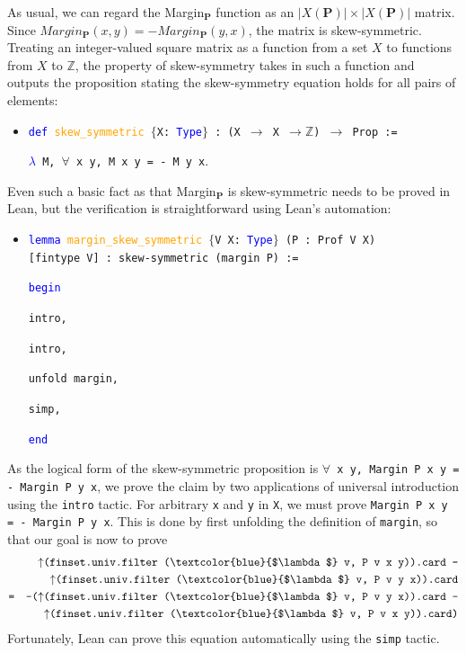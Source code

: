 \documentclass[runningheads]{llncs}
\begin{document}
As usual, we can regard the Margin$_\mathbf{P}$ function as an $|X(\mathbf{P})|\times |X(\mathbf{P})|$ matrix. Since $Margin_\mathbf{P}(x,y)=-Margin_\mathbf{P}(y,x)$, the matrix is skew-symmetric. Treating an integer-valued square matrix as a function from a set $X$ to functions from $X$ to $\mathbb{Z}$, the property of skew-symmetry takes in such a function and outputs the proposition stating the skew-symmetry equation holds for all pairs of elements:
\begin{itemize}
\item[] \texttt{\textcolor{blue}{def} \textcolor{orange}{skew\_symmetric} $\{$X: \textcolor{blue}{Type}$\}$ : (X $\to$ X $\to \mathbb{Z}$) $\to$ Prop :=} 

\texttt{\textcolor{blue}{$\lambda$} M, $\forall$ x y, M x y = - M y x}.
\end{itemize}
Even such a basic fact as that Margin$_\mathbf{P}$ is skew-symmetric needs to be proved in Lean, but the verification is straightforward using Lean's automation:
\begin{itemize}
\item[] \texttt{\textcolor{blue}{lemma} \textcolor{orange}{margin\_skew\_symmetric} $\{$V X: \textcolor{blue}{Type}$\}$ (P : Prof V X)}\\ \texttt{[fintype V] : skew-symmetric (margin P) :=} 
 
\texttt{\textcolor{blue}{begin}}

\quad \texttt{intro,}

\quad  \texttt{intro,}

\quad \texttt{unfold margin,}

\quad \texttt{simp,}

\texttt{\textcolor{blue}{end}}
\end{itemize}
As the logical form of the skew-symmetric proposition is \texttt{$\forall$ x y, Margin~P~x~y = - Margin P y x}, we prove the claim by two applications of universal introduction using the \texttt{intro} tactic. For arbitrary \texttt{x} and \texttt{y} in \texttt{X}, we must prove \texttt{Margin~P~x~y = - Margin P y x}. This is done by first unfolding the definition of \texttt{margin}, so that our goal is now to prove  
\begin{eqnarray*}
&&\mbox{\texttt{$\uparrow$(finset.univ.filter (\textcolor{blue}{$\lambda$} v, P v x y)).card -}} \\ 
  &&      \mbox{\texttt{$\uparrow$(finset.univ.filter (\textcolor{blue}{$\lambda$} v, P v y x)).card}}\\
  &\texttt{=}& \mbox{\texttt{-($\uparrow$(finset.univ.filter (\textcolor{blue}{$\lambda$} v, P v y x)).card -}} \\ 
    &&      \mbox{\texttt{$\uparrow$(finset.univ.filter (\textcolor{blue}{$\lambda$} v, P v x y)).card)}}
\end{eqnarray*}
Fortunately, Lean can prove this equation automatically using the \texttt{simp} tactic.
\end{document}
